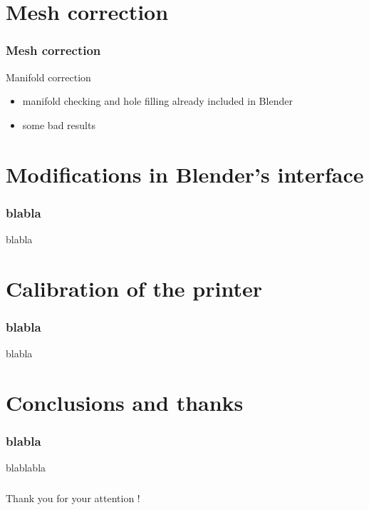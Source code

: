 \documentclass{beamer}
\begin{document}
\section{Mesh correction}
\begin{frame}
	\frametitle{Mesh correction}

    \begin{block}{Manifold correction}
		\begin{itemize}
			\item manifold checking and hole filling already included in Blender
			\item some bad results
		\end{itemize}
    \end{block}
\end{frame}

\section{Modifications in Blender's interface}
\begin{frame}
	\frametitle{blabla}

    \begin{block}{blabla}
    \end{block}
\end{frame}

\section{Calibration of the printer}
\begin{frame}
	\frametitle{blabla}

    \begin{block}{blabla}
    \end{block}
\end{frame}

\section{Conclusions and thanks}
\begin{frame}
	\frametitle{blabla}

    \begin{block}{blablabla}
    \end{block}
\end{frame}

\begin{frame}
	\frametitle{}

    \begin{center}
    \Large{Thank you for your attention !}
    \end{center}
\end{frame}
	
\end{document}

